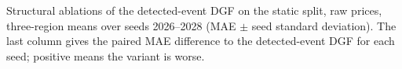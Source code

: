 \providecommand{\materialsdir}{.}
\begin{table}[t]
  \centering
  \caption{Structural ablations of the detected-event DGF on the static split,
    raw prices, three-region means over seeds 2026--2028 (MAE $\pm$ seed
    standard deviation). The last column gives the paired MAE difference to
    the detected-event DGF for each seed; positive means the variant is worse.}
  \label{tab:ablations-static}
  \small
  
\end{table}
